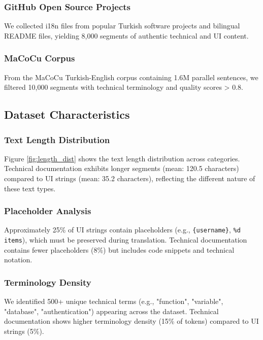 \subsubsection{GitHub Open Source Projects}

We collected i18n files from popular Turkish software projects and bilingual README files, yielding 8,000 segments of authentic technical and UI content.

\subsubsection{MaCoCu Corpus}

From the MaCoCu Turkish-English corpus \cite{macocu2021} containing 1.6M parallel sentences, we filtered 10,000 segments with technical terminology and quality scores > 0.8.

\subsection{Dataset Characteristics}

\subsubsection{Text Length Distribution}

Figure \ref{fig:length_dist} shows the text length distribution across categories. Technical documentation exhibits longer segments (mean: 120.5 characters) compared to UI strings (mean: 35.2 characters), reflecting the different nature of these text types.

\subsubsection{Placeholder Analysis}

Approximately 25\% of UI strings contain placeholders (e.g., \texttt{\{username\}}, \texttt{\%d items}), which must be preserved during translation. Technical documentation contains fewer placeholders (8\%) but includes code snippets and technical notation.

\subsubsection{Terminology Density}

We identified 500+ unique technical terms (e.g., "function", "variable", "database", "authentication") appearing across the dataset. Technical documentation shows higher terminology density (15\% of tokens) compared to UI strings (5\%).

